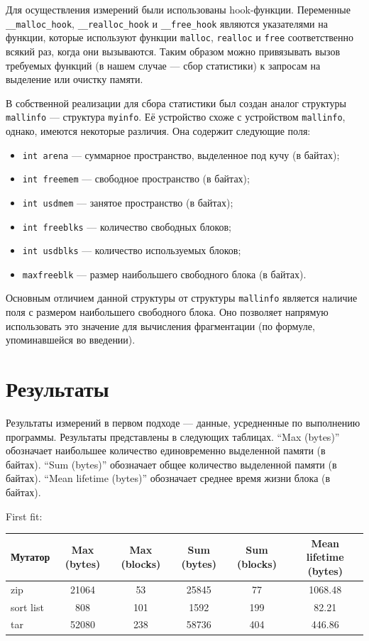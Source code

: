Для осуществления измерений были использованы hook-функции. Переменные \texttt{\_\_malloc\_hook}, \texttt{\_\_realloc\_hook} 
и \texttt{\_\_free\_hook} являются указателями на функции, которые используют функции \texttt{malloc}, \texttt{realloc} и \texttt{free} 
соответственно всякий раз, когда они вызываются. Таким образом можно привязывать вызов требуемых функций (в нашем случае --- 
сбор статистики) к запросам на выделение или очистку памяти.
   
В собственной реализации для сбора статистики был создан аналог структуры \texttt{mallinfo} --- структура \texttt{myinfo}.
Её устройство схоже с устройством \texttt{mallinfo}, однако, имеются некоторые различия. Она содержит следующие поля:

\begin{itemize}
\item \texttt{int arena} --- суммарное пространство, выделенное под кучу (в байтах);
\item \texttt{int freemem} --- свободное пространство (в байтах);
\item \texttt{int usdmem} --- занятое пространство (в байтах);
\item \texttt{int freeblks} --- количество свободных блоков;
\item \texttt{int usdblks} --- количество используемых блоков;
\item \texttt{maxfreeblk} --- размер наибольшего свободного блока (в байтах).
\end{itemize} 
   
Основным отличием данной структуры от структуры \texttt{mallinfo} является наличие поля с размером наибольшего свободного
блока. Оно позволяет напрямую использовать это значение для вычисления фрагментации (по формуле, упоминавшейся
во введении).
   
   
\section{Результаты}
   
Результаты измерений в первом подходе --- данные, усредненные по выполнению программы. Результаты представлены в следующих 
таблицах. ``Max (bytes)'' обозначает наибольшее количество единовременно выделенной памяти (в байтах). ``Sum (bytes)''
 обозначает общее количество выделенной памяти (в байтах). ``Mean lifetime (bytes)'' обозначает среднее время жизни блока
(в байтах).
    
    First fit:

    \begin{center}
    \begin{tabular}{| l | c | c | c | c | c |}
    \hline
    Мутатор & Max (bytes) & Max (blocks) & Sum (bytes) & Sum (blocks) & Mean lifetime (bytes)\\
    \hline
    zip & 21064 & 53 & 25845 & 77 & 1068.48\\
    \hline
    sort list & 808 & 101 & 1592 & 199 & 82.21 \\
    \hline
    tar & 52080 & 238 & 58736 & 404 & 446.86 \\
    \hline
    \end{tabular}
    \end{center}

